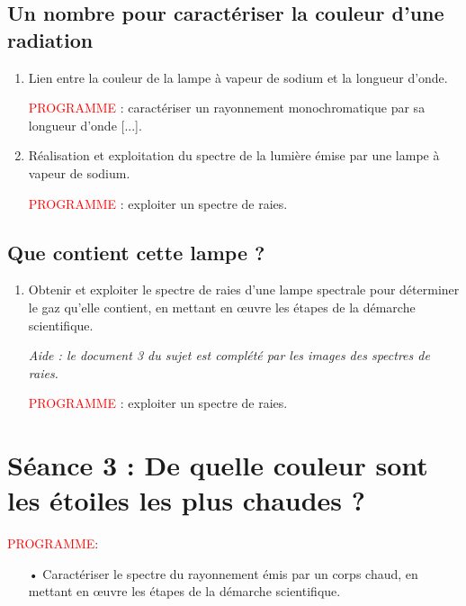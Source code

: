 \documentclass[12pt,a4paper,fleqn]{article}
\newcommand{\prog}{\textcolor{red}{PROGRAMME}}
\begin{document}
\subsection*{Un nombre pour caractériser la \og couleur \fg{} d'une radiation}

\begin{enumerate}[resume]
\item \app{} \anarai{}

Lien entre la couleur de la lampe à vapeur de sodium et la longueur d'onde.

\prog{} : caractériser un rayonnement monochromatique par sa longueur d'onde [...].

\item \rea{} \val{}

Réalisation et exploitation du spectre de la lumière émise par une lampe à vapeur de sodium.

\prog{} : exploiter un spectre de raies.
\end{enumerate}

\subsection*{Que contient cette lampe ?}

\begin{enumerate}[resume]
\item \app{} \anarai{} \rea{} \val{} \com{}

Obtenir et exploiter le spectre de raies d'une lampe spectrale pour déterminer le gaz qu'elle contient, en mettant en œuvre les étapes de la démarche scientifique.

\textit{Aide : le document 3 du sujet est complété par les images des spectres de raies.}

\prog{} : exploiter un spectre de raies.
\end{enumerate}





\newpage

\section*{\textcolor{bleu_f}{Séance 3 : De quelle couleur sont les étoiles les plus chaudes ?}}

\prog :
\begin{itemize}
\item[•] Caractériser le spectre du rayonnement émis par un corps chaud, en mettant en œuvre les étapes de la démarche scientifique.
\end{itemize}
\end{document}
